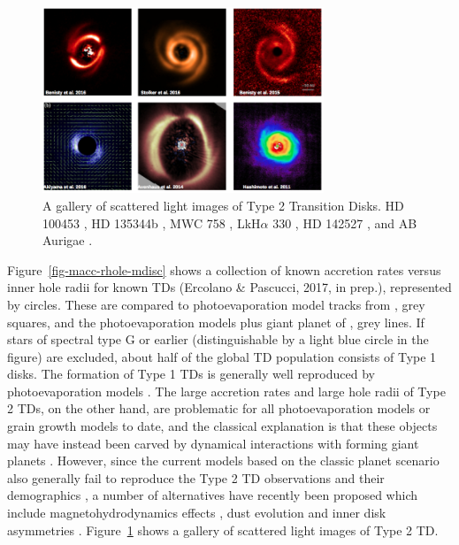 \documentclass[10pt,fleqn,twoside]{article}
\begin{document}
\begin{figure}
\centerline{\includegraphics[width=0.75\textwidth]{figures/Type2TD_Scat.png}}
\caption{\label{fig-type2-scat}
  A gallery of scattered light images of Type 2 Transition Disks. 
 HD 100453 
\citep{2017A&A...597A..42B}, HD 135344b \citep{2016A&A...595A.113S},
MWC 758 \citep{2015A&A...578L...6B}, LkH$\alpha$ 330 \citep{2016AJ....152..222A}, 
HD 142527 \citep{2014ApJ...781...87A}, and AB Aurigae \citep{2011ApJ...729L..17H}.} 
\end{figure}

Figure~\ref{fig-macc-rhole-mdisc} shows a collection of known accretion rates versus inner hole
radii for known TDs (Ercolano \& Pascucci, 2017, in prep.),
represented by circles. These are compared to photoevaporation model tracks from
\citet{2011MNRAS.412...13O}, grey squares, and the photoevaporation models plus giant planet
of \citet{2013MNRAS.430.1392R, 2015MNRAS.454.2173R}, grey lines. 
If stars of spectral type G or earlier (distinguishable by a light
blue circle in the figure) are excluded, about half of the global TD population consists of Type 1
disks. The formation of Type 1 TDs is generally well reproduced by
photoevaporation models \citep[e.g.,][]{2010MNRAS.401.1415O, 2011MNRAS.412...13O}.
The large accretion rates and large hole
radii of Type 2 TDs, on the other hand, are problematic for all 
photoevaporation models \citep[e.g.,][]{2013MNRAS.430.1392R, 2015MNRAS.454.2173R}
or grain
growth models \citep{2012A&A...544A..79B} to date, and the classical explanation is that
these objects may have instead been carved by dynamical interactions
with forming giant planets \citep[e.g.,][]{2011ApJ...729...47Z}. However, since the
current models based on the classic planet scenario also generally
fail to reproduce the Type 2 TD observations and 
their demographics \citep[see e.g.,][]{2016ApJ...825...77D},
a number of alternatives have recently been proposed which include magnetohydrodynamics
effects \citep[e.e.,][]{2016arXiv160907510W}, dust evolution 
\citep{2016A&A...585A..35P} and inner disk asymmetries \citep{2016ApJ...823L...8M}.
Figure~\ref{fig-type2-scat} shows a gallery of scattered light images of Type 2 TD.
\end{document}
